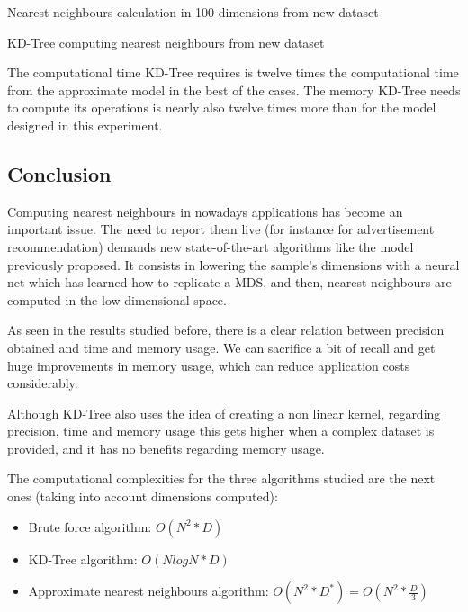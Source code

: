 \documentclass[a4paper,11pt,spanish]{report}
\begin{document}
\begin{table}[h]
\centering

\caption{\label{metrics25}Nearest neighbours calculation in 100 dimensions from new dataset}
\end{table}

\begin{table}[h]
\centering

\caption{\label{metrics26}KD-Tree computing nearest neighbours from new dataset}
\end{table}

The computational time KD-Tree requires is twelve times the computational time from the approximate model in the best of the cases. The memory KD-Tree needs to compute its operations is nearly also twelve times more than for the model designed in this experiment.

\subsection{Conclusion}
\label{ssec:conc2}

Computing nearest neighbours in nowadays applications has become an important issue. The need to report them live (for instance for advertisement recommendation) demands new state-of-the-art algorithms like the model previously proposed. It consists in lowering the sample's dimensions with a neural net which has learned how to replicate a MDS, and then, nearest neighbours are computed in the low-dimensional space.

As seen in the results studied before, there is a clear relation between precision obtained and time and memory usage. We can sacrifice a bit of recall and get huge improvements in memory usage, which can reduce application costs considerably.

Although KD-Tree also uses the idea of creating a non linear kernel, regarding precision, time and memory usage this gets higher when a complex dataset is provided, and it has no benefits regarding memory usage. 

The computational complexities for the three algorithms studied are the next ones (taking into account dimensions computed):

\begin{itemize}
\item Brute force algorithm: $ O(N^{2} * D)$ 
\item KD-Tree algorithm: $ O(NlogN * D)$ 
\item Approximate nearest neighbours algorithm: $ O(N^{2}*D^{*}) = O(N^{2}*\frac{D}{3})$ 
\end{itemize}
\end{document}
